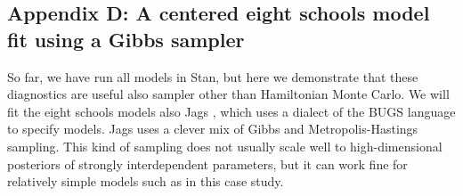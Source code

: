 \documentclass[american,]{article}
\let\oldparagraph\paragraph
\renewcommand{\paragraph}[1]{\oldparagraph{#1}\mbox{}}
\begin{document}



\hypertarget{eight-schools-with-jags}{%
\subsection*{Appendix D: A centered eight schools model fit using a Gibbs sampler}\label{eight-schools-with-jags}}

So far, we have run all models in Stan, but here we demonstrate that
these diagnostics are useful also sampler other than 
Hamiltonian Monte Carlo.  We will fit the eight schools models also
 Jags \citep{plummer2003jags}, which uses a dialect of the BUGS
language \citep{lunn2009bugs} to specify models. Jags uses a clever
mix of Gibbs and Metropolis-Hastings sampling. This kind of sampling
does not usually scale well to high-dimensional posteriors of strongly
interdependent parameters, but it can work fine for relatively simple models such as in this case study.


\end{document}

